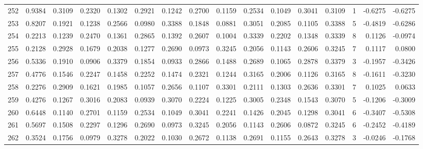 \begin{tabular}{lrrrrrrrrrrrrrrr}
252 &      0.9384 &  0.3109 &  0.2320 &  0.1302 &  0.2921 &  0.1242 &  0.2700 &  0.1159 &  0.2534 &  0.1049 &   0.3041 &     0.3109 &      1 &                   -0.6275 &                    -0.6275 \\
253 &      0.8207 &  0.1921 &  0.1238 &  0.2566 &  0.0980 &  0.3388 &  0.1848 &  0.0881 &  0.3051 &  0.2085 &   0.1105 &     0.3388 &      5 &                   -0.4819 &                    -0.6286 \\
254 &      0.2213 &  0.1239 &  0.2470 &  0.1361 &  0.2865 &  0.1392 &  0.2607 &  0.1004 &  0.3339 &  0.2202 &   0.1348 &     0.3339 &      8 &                    0.1126 &                    -0.0974 \\
255 &      0.2128 &  0.2928 &  0.1679 &  0.2038 &  0.1277 &  0.2690 &  0.0973 &  0.3245 &  0.2056 &  0.1143 &   0.2606 &     0.3245 &      7 &                    0.1117 &                     0.0800 \\
256 &      0.5336 &  0.1910 &  0.0906 &  0.3379 &  0.1854 &  0.0933 &  0.2866 &  0.1488 &  0.2689 &  0.1065 &   0.2878 &     0.3379 &      3 &                   -0.1957 &                    -0.3426 \\
257 &      0.4776 &  0.1546 &  0.2247 &  0.1458 &  0.2252 &  0.1474 &  0.2321 &  0.1244 &  0.3165 &  0.2006 &   0.1126 &     0.3165 &      8 &                   -0.1611 &                    -0.3230 \\
258 &      0.2276 &  0.2909 &  0.1621 &  0.1985 &  0.1057 &  0.2656 &  0.1107 &  0.3301 &  0.2111 &  0.1303 &   0.2636 &     0.3301 &      7 &                    0.1025 &                     0.0633 \\
259 &      0.4276 &  0.1267 &  0.3016 &  0.2083 &  0.0939 &  0.3070 &  0.2224 &  0.1225 &  0.3005 &  0.2348 &   0.1543 &     0.3070 &      5 &                   -0.1206 &                    -0.3009 \\
260 &      0.6448 &  0.1140 &  0.2701 &  0.1159 &  0.2534 &  0.1049 &  0.3041 &  0.2241 &  0.1426 &  0.2045 &   0.1298 &     0.3041 &      6 &                   -0.3407 &                    -0.5308 \\
261 &      0.5697 &  0.1508 &  0.2297 &  0.1296 &  0.2690 &  0.0973 &  0.3245 &  0.2056 &  0.1143 &  0.2606 &   0.0872 &     0.3245 &      6 &                   -0.2452 &                    -0.4189 \\
262 &      0.3524 &  0.1756 &  0.0979 &  0.3278 &  0.2022 &  0.1030 &  0.2672 &  0.1138 &  0.2691 &  0.1155 &   0.2643 &     0.3278 &      3 &                   -0.0246 &                    -0.1768 \\

\end{tabular}

